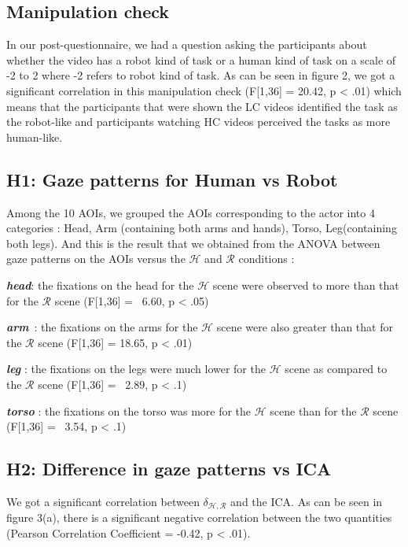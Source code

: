 \documentclass[a4,twocolumn,10pt]{article}
\begin{document}
\subsection{Manipulation check}

In our post-questionnaire, we had a question asking the participants about
whether the video has a robot kind of task or a human kind of task on a scale of
-2 to 2 where -2 refers to robot kind of task. As can be seen in figure 2, we
got a significant correlation in this manipulation check (F[1,36] = 20.42, p <
.01) which means that the participants that were shown the LC videos identified
the task as the robot-like and participants watching HC videos perceived the
tasks as more human-like. 




\subsection{H1: Gaze patterns for Human vs Robot}

Among the 10 AOIs, we grouped the AOIs corresponding to the actor into 4
categories : Head, Arm (containing both arms and hands), Torso, Leg(containing
both legs). And this is the result that we obtained from the ANOVA between gaze
patterns on the AOIs versus the $\mathcal{H}$ and $\mathcal{R}$ conditions :

\textit{\textbf{head}}: the fixations on the head for the $\mathcal{H}$ scene
were observed to more than that for the $\mathcal{R}$ scene (F[1,36] = \ 6.60, p
< .05)

\textit{\textbf{arm}}\ : the fixations on the arms for the $\mathcal{H}$ scene
were also greater than that for the $\mathcal{R}$ scene (F[1,36] = 18.65, p <
.01)

\textit{\textbf{leg}}\hspace{0.18cm} : the fixations on the legs were much lower
for the $\mathcal{H}$ scene as compared to the $\mathcal{R}$ scene (F[1,36] = \
2.89, p < .1)

\textit{\textbf{torso}} : the fixations on the torso was more for the
$\mathcal{H}$ scene than for the $\mathcal{R}$ scene (F[1,36] = \ 3.54, p < .1) 

\subsection{H2: Difference in gaze patterns vs ICA}

We got a significant correlation between $\delta_{\mathcal{H},\mathcal{R}}$ and
the ICA. As can be seen in figure 3(a), there is a significant negative
correlation between the two quantities (Pearson Correlation Coefficient = -0.42,
p < .01).
\end{document}

